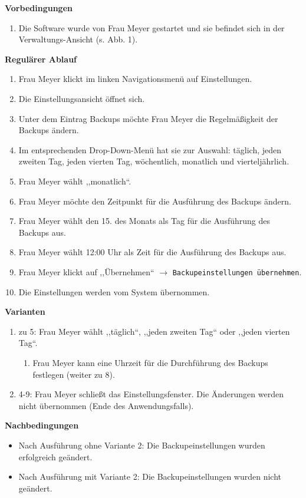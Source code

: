 \documentclass[fontsize=12pt,paper=a4,twoside]{scrartcl}
\begin{document}
\textbf{Vorbedingungen}
\begin{enumerate}
\item Die Software wurde von Frau Meyer gestartet und sie befindet sich in der Verwaltungs-Ansicht (s. Abb. 1).
\end{enumerate}
\vspace{5pt}

\textbf{Regulärer Ablauf}
\begin{enumerate}
\item Frau Meyer klickt im linken Navigationsmenü auf Einstellungen.
\item Die Einstellungsansicht öffnet sich. 
\item Unter dem Eintrag Backups möchte Frau Meyer die Regelmäßigkeit der Backups ändern.
\item Im entsprechenden Drop-Down-Menü hat sie zur Auswahl: täglich, jeden zweiten Tag, jeden vierten Tag, wöchentlich, monatlich und vierteljährlich.
\item Frau Meyer wählt ,,monatlich``.
\item Frau Meyer möchte den Zeitpunkt für die Ausführung des Backups ändern.
\item Frau Meyer wählt den 15. des Monats als Tag für die Ausführung des Backups aus.
\item Frau Meyer wählt 12:00 Uhr als Zeit für die Ausführung des Backups aus.
\item Frau Meyer klickt auf ,,Übernehmen`` $\rightarrow$ \texttt{Backupeinstellungen übernehmen}.
\item Die Einstellungen werden vom System übernommen.
\end{enumerate}
\vspace{5pt}

\textbf{Varianten}
\begin{enumerate}
\item zu 5: Frau Meyer wählt ,,täglich``, ,,jeden zweiten Tag`` oder ,,jeden vierten Tag``.
	\begin{enumerate}[label=\arabic*.]
	\item Frau Meyer kann eine Uhrzeit für die Durchführung des Backups festlegen (weiter zu 8).
	\end{enumerate}
\item 4-9: Frau Meyer schließt das Einstellungsfenster. Die Änderungen werden nicht übernommen (Ende des Anwendungsfalls).
\end{enumerate}
\vspace{5pt}

\textbf{Nachbedingungen}
\begin{itemize}
\item Nach Ausführung ohne Variante 2: Die Backupeinstellungen wurden erfolgreich geändert.
\item Nach Ausführung mit Variante 2: Die Backupeinstellungen wurden nicht geändert.
\end{itemize}
\vspace{5pt}
\end{document}
